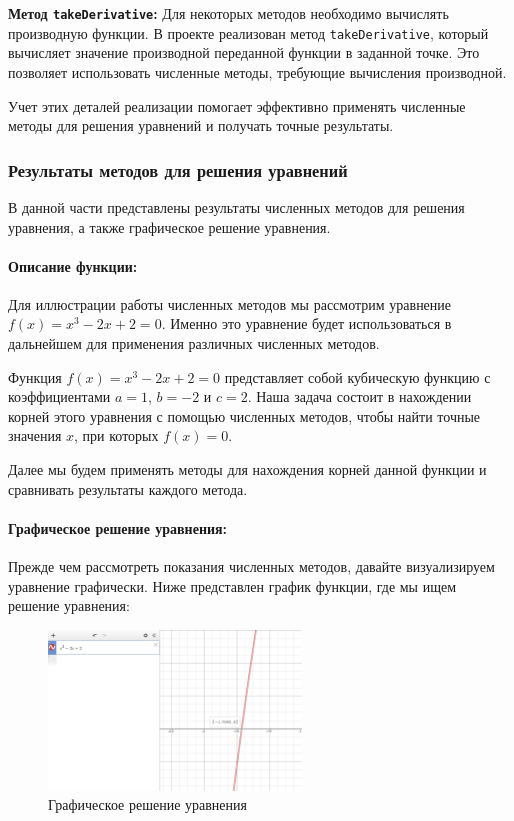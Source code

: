 \documentclass[12pt]{article}
\begin{document}
    \textbf{Метод \texttt{takeDerivative}:}
    Для некоторых методов необходимо вычислять производную функции. В проекте реализован метод \texttt{takeDerivative}, который вычисляет значение производной переданной функции в заданной точке. Это позволяет использовать численные методы, требующие вычисления производной.

    Учет этих деталей реализации помогает эффективно применять численные методы для решения уравнений и получать точные результаты.

    \subsubsection{Результаты методов для решения уравнений}
    В данной части представлены результаты численных методов для решения уравнения, а также графическое решение уравнения.

    \paragraph{Описание функции:}
    Для иллюстрации работы численных методов мы рассмотрим уравнение $f(x) = x^3 - 2x + 2=0$. Именно это уравнение будет использоваться в дальнейшем для применения различных численных методов.

    Функция $f(x) = x^3 - 2x + 2=0$ представляет собой кубическую функцию с коэффициентами $a = 1$, $b = -2$ и $c = 2$. Наша задача состоит в нахождении корней этого уравнения с помощью численных методов, чтобы найти точные значения $x$, при которых $f(x) = 0$.

    Далее мы будем применять методы для нахождения корней данной функции и сравнивать результаты каждого метода.

    \paragraph{Графическое решение уравнения:}
    Прежде чем рассмотреть показания численных методов, давайте визуализируем уравнение графически. Ниже представлен график функции, где мы ищем решение уравнения:

    \clearpage

    \begin{figure}[h]
        \centering
        \includegraphics[width=0.6\textwidth]{image/graph_equation}
        \caption{Графическое решение уравнения}
    \end{figure}
\end{document}
